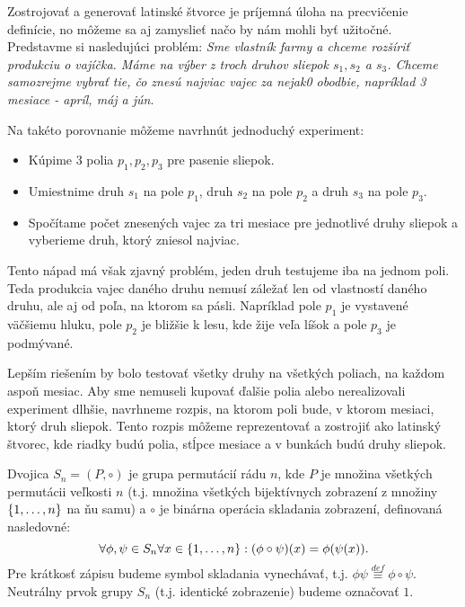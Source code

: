 \begin{example}
Zostrojovať a generovať latinské štvorce je príjemná úloha na precvičenie definície, no môžeme sa aj zamyslieť načo by nám mohli byť užitočné. Predstavme si nasledujúci problém: \textit{Sme vlastník farmy a chceme rozšíriť produkciu o vajíčka. Máme na výber z troch druhov sliepok $s_1, s_2$ a $s_3$. Chceme samozrejme vybrať tie, čo znesú najviac vajec za nejak0 obodbie, napríklad 3 mesiace - apríl, máj a jún}.

Na takéto porovnanie môžeme navrhnút jednoduchý experiment:
\begin{itemize}
    \item Kúpime $3$ polia $p_1, p_2, p_3$ pre pasenie sliepok.
    \item Umiestnime druh $s_1$ na pole $p_1$, druh $s_2$ na pole $p_2$ a druh $s_3$ na pole $p_3$.
    \item Spočítame počet znesených vajec za tri mesiace pre jednotlivé druhy sliepok a vyberieme druh, ktorý zniesol najviac.
\end{itemize}

Tento nápad má však zjavný problém, jeden druh testujeme iba na jednom poli. Teda produkcia vajec daného druhu nemusí záležať len od vlastností daného druhu, ale aj od poľa, na ktorom sa pásli. Napríklad pole $p_1$ je vystavené väčšiemu hluku, pole $p_2$ je bližšie k lesu, kde žije veľa líšok a pole $p_3$ je podmývané.

Lepším riešením by bolo testovať všetky druhy na všetkých poliach, na každom aspoň mesiac. Aby sme nemuseli kupovať ďalšie polia alebo nerealizovali experiment dlhšie, navrhneme rozpis, na ktorom poli bude, v ktorom mesiaci, ktorý druh sliepok. Tento rozpis môžeme reprezentovať a zostrojiť ako latinský štvorec, kde riadky budú polia, stĺpce mesiace a v bunkách budú druhy sliepok.

\end{example}

\begin{definition}
Dvojica $S_n = (P, \circ)$ je grupa permutácií rádu $n$, kde $P$ je množina všetkých permutácii veľkosti $n$ (t.j. množina všetkých bijektívnych zobrazení z množiny $\left\{1, \ldots, n\right\}$ na ňu samu) a $\circ$ je binárna operácia skladania zobrazení, definovaná nasledovné: $$\forall\phi,\psi\in S_n  \forall x \in \left\{1, \ldots, n\right\}: (\phi \circ \psi)(x) = \phi(\psi(x)).$$ 
Pre krátkosť zápisu budeme symbol skladania vynechávať, t.j. $\phi \psi \overset{def}{\equiv} \phi \circ \psi$. 
Neutrálny prvok grupy $S_n$ (t.j. identické zobrazenie) budeme označovať $1$.
\end{definition}

